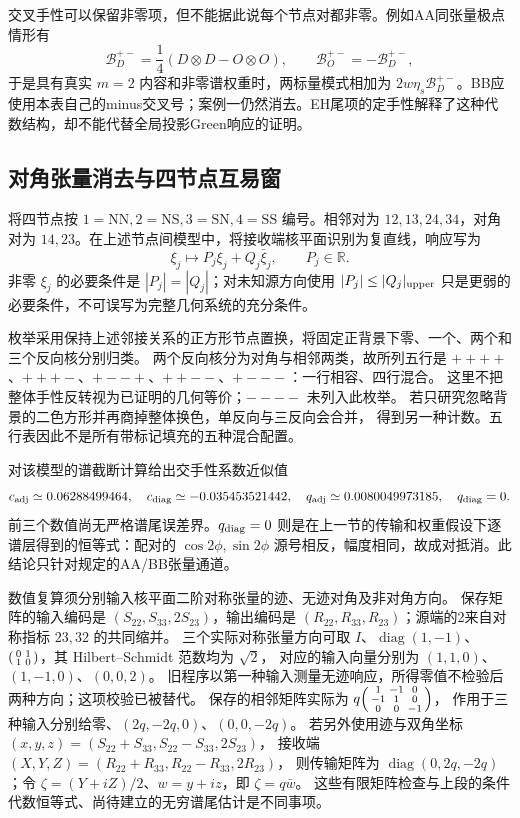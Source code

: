 \documentclass[UTF8,a4paper,11pt,fontset=fandol]{ctexart}
\numberwithin{equation}{section}
\theoremstyle{definition}
\newcommand{\R}{\mathbb R}
\begin{document}
交叉手性可以保留非零项，但不能据此说每个节点对都非零。例如AA同张量极点情形有
\[
\mathcal B_D^{+-}=\frac14(D\otimes D-O\otimes O),\qquad
\mathcal B_O^{+-}=-\mathcal B_D^{+-},
\]
于是具有真实 $m=2$ 内容和非零谱权重时，两标量模式相加为 $2w\eta_s\mathcal B_D^{+-}$。BB应使用本表自己的minus交叉号；案例一仍然消去。EH尾项的定手性解释了这种代数结构，却不能代替全局投影Green响应的证明。

\subsection{对角张量消去与四节点互易窗}
将四节点按 $1=\mathrm{NN},2=\mathrm{NS},3=\mathrm{SN},4=\mathrm{SS}$ 编号。相邻对为 $12,13,24,34$，对角对为 $14,23$。在上述节点间模型中，将接收端核平面识别为复直线，响应写为
\[
\xi_j\longmapsto P_j\xi_j+Q_j\bar\xi_j,
\qquad P_j\in\R.
\]
非零 $\xi_j$ 的必要条件是 $|P_j|=|Q_j|$；对未知源方向使用 $|P_j|\le |Q_j|_{\rm upper}$ 只是更弱的必要条件，不可误写为完整几何系统的充分条件。

枚举采用保持上述邻接关系的正方形节点置换，将固定正背景下零、一个、两个和三个反向核分别归类。
两个反向核分为对角与相邻两类，故所列五行是
$++++$、$+++-$、$+--+$、$++--$、$+---$：一行相容、四行混合。
这里不把整体手性反转视为已证明的几何等价；$----$ 未列入此枚举。
若只研究忽略背景的二色方形并再商掉整体换色，单反向与三反向会合并，
得到另一种计数。五行表因此不是所有带标记填充的五种混合配置。

对该模型的谱截断计算给出交手性系数近似值
\[
c_{\rm adj}\simeq0.06288499464,\quad
c_{\rm diag}\simeq-0.035453521442,\quad
q_{\rm adj}\simeq0.0080049973185,\quad q_{\rm diag}=0.
\]
前三个数值尚无严格谱尾误差界。$q_{\rm diag}=0$ 则是在上一节的传输和权重假设下逐谱层得到的恒等式：配对的 $\cos2\phi,\sin2\phi$ 源号相反，幅度相同，故成对抵消。此结论只针对规定的AA/BB张量通道。

数值复算须分别输入核平面二阶对称张量的迹、无迹对角及非对角方向。
保存矩阵的输入编码是 $(S_{22},S_{33},2S_{23})$，输出编码是
$(R_{22},R_{33},R_{23})$；源端的2来自对称指标 $23,32$ 的共同缩并。
三个实际对称张量方向可取 $I$、$\operatorname{diag}(1,-1)$、
$\begin{psmallmatrix}0&1\\1&0\end{psmallmatrix}$，其 Hilbert--Schmidt 范数均为 $\sqrt2$，
对应的输入向量分别为 $(1,1,0)$、$(1,-1,0)$、$(0,0,2)$。
旧程序以第一种输入测量无迹响应，所得零值不检验后两种方向；这项校验已被替代。
保存的相邻矩阵实际为
$q\begin{psmallmatrix}1&-1&0\\-1&1&0\\0&0&-1\end{psmallmatrix}$，
作用于三种输入分别给零、$(2q,-2q,0)$、$(0,0,-2q)$。
若另外使用迹与双角坐标 $(x,y,z)=(S_{22}+S_{33},S_{22}-S_{33},2S_{23})$，
接收端 $(X,Y,Z)=(R_{22}+R_{33},R_{22}-R_{33},2R_{23})$，
则传输矩阵为 $\operatorname{diag}(0,2q,-2q)$；令
$\zeta=(Y+iZ)/2$、$w=y+iz$，即 $\zeta=q\bar w$。
这些有限矩阵检查与上段的条件代数恒等式、尚待建立的无穷谱尾估计是不同事项。
\end{document}
